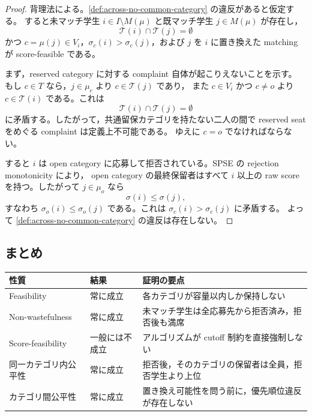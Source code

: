 \documentclass[
  12pt,
  a4paper,
  oneside,
  onecolumn,
  titlepage,
  final
]{jsarticle}
\newcommand{\1}{\mathbf{1}}
\begin{document}
\begin{proof}
背理法による。\cref{def:across-no-common-category} の違反があると仮定する。
すると未マッチ学生 $i\in I\setminus M(\mu)$ と既マッチ学生 $j\in M(\mu)$ が存在し，
\[
    \mathcal T(i)\cap\mathcal T(j)=\emptyset
\]
かつ $c=\mu(j)\in V_i$，$\sigma_c(i)>\sigma_c(j)$，および $j$ を $i$ に置き換えた
matching が score-feasible である。

まず，reserved category に対する complaint 自体が起こりえないことを示す。
もし $c\in T$ なら，$j\in\mu_c$ より $c\in\mathcal T(j)$ であり，
また $c\in V_i$ かつ $c\neq o$ より $c\in\mathcal T(i)$ である。これは
\[
    \mathcal T(i)\cap\mathcal T(j)=\emptyset
\]
に矛盾する。したがって，共通留保カテゴリを持たない二人の間で
reserved seat をめぐる complaint は定義上不可能である。
ゆえに $c=o$ でなければならない。

すると $i$ は open category に応募して拒否されている。SPSE の rejection monotonicity により，
open category の最終保留者はすべて $i$ 以上の raw score を持つ。したがって $j\in\mu_o$ なら
\[
    \sigma(i)\le \sigma(j),
\]
すなわち $\sigma_o(i)\le \sigma_o(j)$ である。これは $\sigma_c(i)>\sigma_c(j)$ に矛盾する。
よって \cref{def:across-no-common-category} の違反は存在しない。
\end{proof}

\subsection{まとめ}

\begin{center}
\renewcommand{\arraystretch}{1.4}
\begin{tabular}{lll}
\toprule
\textbf{性質} & \textbf{結果} & \textbf{証明の要点} \\
\midrule
Feasibility              & 常に成立     & 各カテゴリが容量以内しか保持しない \\
Non-wastefulness         & 常に成立     & 未マッチ学生は全応募先から拒否済み，拒否後も満席 \\
Score-feasibility        & 一般には不成立 & アルゴリズムが cutoff 制約を直接強制しない \\
同一カテゴリ内公平性     & 常に成立     & 拒否後，そのカテゴリの保留者は全員，拒否学生より上位 \\
カテゴリ間公平性         & 常に成立     & 置き換え可能性を問う前に，優先順位違反が存在しない \\
\bottomrule
\end{tabular}
\end{center}
\end{document}
